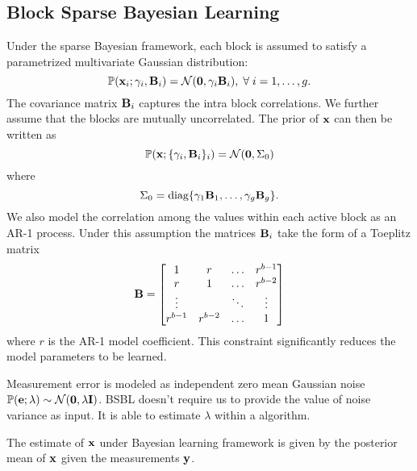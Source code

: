 \subsection{Block Sparse Bayesian Learning}
Under the sparse Bayesian framework, each block
is assumed to satisfy a parametrized multivariate
Gaussian distribution:
\begin{equation}
\mathbb{P}(\mathbf{x}_i ; \gamma_i, \mathbf{B}_i) = \mathcal{N}(\mathbf{0}, \gamma_i \mathbf{B}_i), \; \forall \; i=1,\dots,g.
\end{equation}
The covariance matrix $\mathbf{B}_i$ captures the intra block correlations.
We further assume that the blocks are mutually uncorrelated.
The prior of $\mathbf{x}$ can then be written as
\begin{equation}
\mathbb{P}(\mathbf{x}; \{ \gamma_i, \mathbf{B}_i\}_i ) = \mathcal{N}(\mathbf{0}, \Sigma_0)
\end{equation}
where
\begin{equation}
\Sigma_0 = \text{diag}\{\gamma_1 \mathbf{B}_1, \dots, \gamma_g \mathbf{B}_g \}.
\end{equation}
We also model the correlation among the values
within each active block as an AR-1 process.
Under this assumption the matrices
$\mathbf{B}_i$ take the form of a Toeplitz matrix
\begin{equation}
\mathbf{B} = \begin{bmatrix}
1 & r & \dots & r^{b-1}\\
r & 1 & \dots & r^{b-2}\\
\vdots &  & \ddots & \vdots\\
r^{b-1} & r^{b-2} & \dots & 1
\end{bmatrix}
\end{equation}
where $r$ is the AR-1 model coefficient.
This constraint significantly reduces the model parameters to be learned.

Measurement error is modeled as independent zero mean Gaussian
noise $\mathbb{P}(\mathbf{e}; \lambda) \sim \mathcal{N}(\mathbf{0}, \lambda \mathbf{I})$.
BSBL doesn't require us to provide the value of noise variance
as input.
It is able to estimate $\lambda$ within a algorithm.

The estimate of $\mathbf{x}$ under Bayesian learning framework
is given by the posterior mean of $\mathbf{x}$ given the measurements $\mathbf{y}$.



